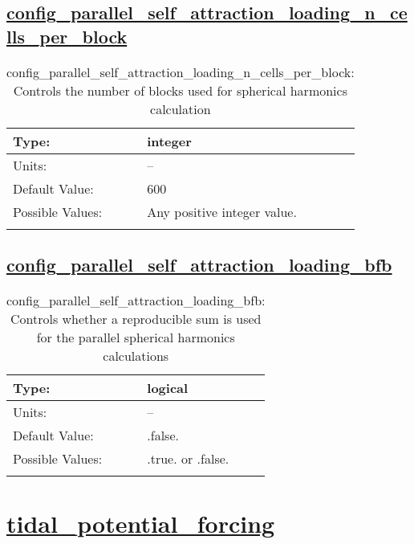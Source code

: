 \subsection[config\_parallel\_self\_attraction\_loading\_n\_cells\_per\_block]{\hyperref[sec:nm_tab_self_attraction_loading]{config\_parallel\_self\_attraction\_loading\_n\_cells\_per\_block}}
\label{subsec:nm_sec_config_parallel_self_attraction_loading_n_cells_per_block}
\begin{center}
\begin{longtable}{| p{2.0in} || p{4.0in} |}
    \hline
    Type: & integer \\
    \hline
    Units: & -- \\
    \hline
    Default Value: & 600 \\
    \hline
    Possible Values: & Any positive integer value. \\
    \hline
    \caption{config\_parallel\_self\_attraction\_loading\_n\_cells\_per\_block: Controls the number of blocks used for spherical harmonics calculation}
\end{longtable}
\end{center}
\subsection[config\_parallel\_self\_attraction\_loading\_bfb]{\hyperref[sec:nm_tab_self_attraction_loading]{config\_parallel\_self\_attraction\_loading\_bfb}}
\label{subsec:nm_sec_config_parallel_self_attraction_loading_bfb}
\begin{center}
\begin{longtable}{| p{2.0in} || p{4.0in} |}
    \hline
    Type: & logical \\
    \hline
    Units: & -- \\
    \hline
    Default Value: & .false. \\
    \hline
    Possible Values: & .true. or .false. \\
    \hline
    \caption{config\_parallel\_self\_attraction\_loading\_bfb: Controls whether a reproducible sum is used for the parallel spherical harmonics calculations}
\end{longtable}
\end{center}
\section[tidal\_potential\_forcing]{\hyperref[sec:nm_tab_tidal_potential_forcing]{tidal\_potential\_forcing}}
\label{sec:nm_sec_tidal_potential_forcing}
